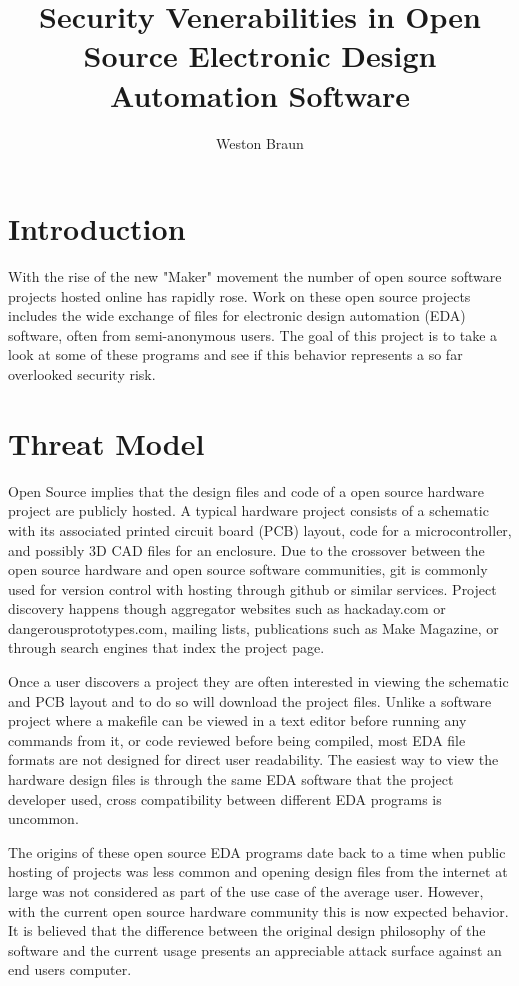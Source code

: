 \documentclass[12pt]{article}
\begin{document}
\title{Security Venerabilities in Open Source Electronic Design Automation Software}
\author{Weston Braun}
\maketitle

\section{Introduction}
\label{S:1}
With the rise of the new "Maker" movement the number of open source software projects hosted online has rapidly rose. Work on these open source projects includes the wide exchange of files for electronic design automation (EDA) software, often from semi-anonymous users. The goal of this project is to take a look at some of these programs and see if this behavior represents a so far overlooked security risk. 

\section{Threat Model}
\label{S:2}
Open Source implies that the design files and code of a open source hardware project are publicly hosted. A typical hardware project consists of a schematic with its associated printed circuit board (PCB) layout, code for a microcontroller, and possibly 3D CAD files for an enclosure. Due to the crossover between the open source hardware and open source software communities, git is commonly used for version control with hosting through github or similar services. Project discovery happens though aggregator websites such as hackaday.com or dangerousprototypes.com, mailing lists, publications such as Make Magazine, or through search engines that index the project page. 

Once a user discovers a project they are often interested in viewing the schematic and PCB layout and to do so will download the project files. Unlike a software project where a makefile can be viewed in a text editor before running any commands from it, or code reviewed before being compiled, most EDA file formats are not designed for direct user readability. The easiest way to view the hardware design files is through the same EDA software that the project developer used, cross compatibility between different EDA programs is uncommon. 

The origins of these open source EDA programs date back to a time when public hosting of projects was less common and opening design files from the internet at large was not considered as part of the use case of the average user. However, with the current open source hardware community this is now expected behavior. It is believed that the difference between the original design philosophy of the software and the current usage presents an appreciable attack surface against an end users computer.  
\end{document}
